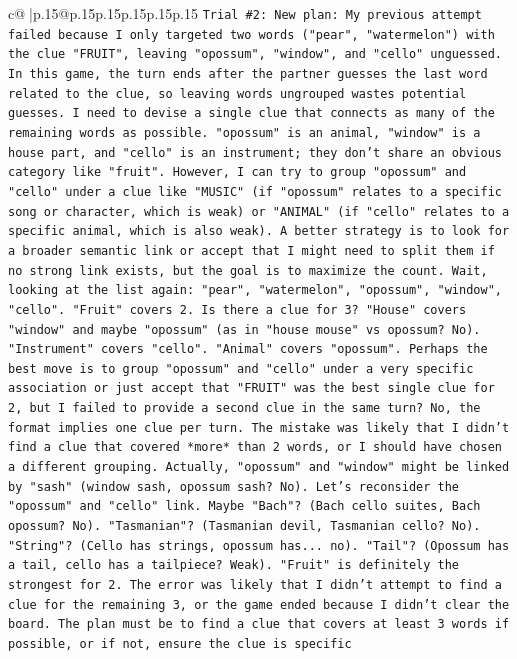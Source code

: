 \documentclass{article}
\begin{document}
{\begin{supertabular}{c@{$\;$}|p{.15\linewidth}@{}p{.15\linewidth}p{.15\linewidth}p{.15\linewidth}p{.15\linewidth}p{.15\linewidth}}
{{{\texttt{Trial \#2: New plan: My previous attempt failed because I only targeted two words ("pear", "watermelon") with the clue "FRUIT", leaving "opossum", "window", and "cello" unguessed. In this game, the turn ends after the partner guesses the last word related to the clue, so leaving words ungrouped wastes potential guesses. I need to devise a single clue that connects as many of the remaining words as possible. "opossum" is an animal, "window" is a house part, and "cello" is an instrument; they don't share an obvious category like "fruit". However, I can try to group "opossum" and "cello" under a clue like "MUSIC" (if "opossum" relates to a specific song or character, which is weak) or "ANIMAL" (if "cello" relates to a specific animal, which is also weak). A better strategy is to look for a broader semantic link or accept that I might need to split them if no strong link exists, but the goal is to maximize the count. Wait, looking at the list again: "pear", "watermelon", "opossum", "window", "cello". "Fruit" covers 2. Is there a clue for 3? "House" covers "window" and maybe "opossum" (as in "house mouse" vs opossum? No). "Instrument" covers "cello". "Animal" covers "opossum". Perhaps the best move is to group "opossum" and "cello" under a very specific association or just accept that "FRUIT" was the best single clue for 2, but I failed to provide a second clue in the same turn? No, the format implies one clue per turn. The mistake was likely that I didn't find a clue that covered *more* than 2 words, or I should have chosen a different grouping. Actually, "opossum" and "window" might be linked by "sash" (window sash, opossum sash? No). Let's reconsider the "opossum" and "cello" link. Maybe "Bach"? (Bach cello suites, Bach opossum? No). "Tasmanian"? (Tasmanian devil, Tasmanian cello? No). "String"? (Cello has strings, opossum has... no). "Tail"? (Opossum has a tail, cello has a tailpiece? Weak). "Fruit" is definitely the strongest for 2. The error was likely that I didn't attempt to find a clue for the remaining 3, or the game ended because I didn't clear the board. The plan must be to find a clue that covers at least 3 words if possible, or if not, ensure the clue is specific} \\
\\ 
}}}
\end{supertabular}}
\end{document}
